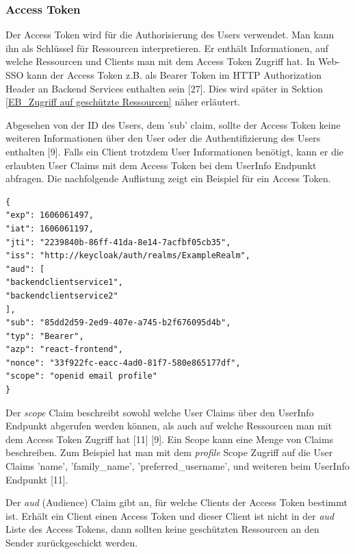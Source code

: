 \subsubsection{Access Token} \label{EB_AccessToken}

Der Access Token wird für die Authorisierung des Users verwendet. Man kann ihn als Schlüssel für Ressourcen interpretieren. Er enthält Informationen, auf welche Ressourcen und Clients man mit dem Access Token Zugriff hat. In Web-SSO kann der Access Token z.B. als Bearer Token im HTTP Authorization Header an Backend Services enthalten sein [27]. Dies wird später in Sektion \ref{EB_Zugriff auf geschützte Ressourcen} näher erläutert.

Abgesehen von der ID des Users, dem 'sub' claim, sollte der Access Token keine weiteren Informationen über den User oder die Authentifizierung des Users enthalten [9]. Falls ein Client trotzdem User Informationen benötigt, kann er die erlaubten User Claims mit dem Access Token bei dem UserInfo Endpunkt abfragen. Die nachfolgende Auflistung zeigt ein Beispiel für ein Access Token.

\begin{lstlisting}[caption=Beispiel Access Token, captionpos=b]
{
"exp": 1606061497,
"iat": 1606061197,
"jti": "2239840b-86ff-41da-8e14-7acfbf05cb35",
"iss": "http://keycloak/auth/realms/ExampleRealm",
"aud": [
"backendclientservice1",
"backendclientservice2"
],
"sub": "85dd2d59-2ed9-407e-a745-b2f676095d4b",
"typ": "Bearer",
"azp": "react-frontend",
"nonce": "33f922fc-eacc-4ad0-81f7-580e865177df",
"scope": "openid email profile"
}
\end{lstlisting}

Der \emph{scope} Claim beschreibt sowohl welche User Claims über den UserInfo Endpunkt abgerufen werden können, als auch auf welche Ressourcen man mit dem Access Token Zugriff hat [11] [9]. Ein Scope kann eine Menge von Claims beschreiben. Zum Beispiel hat man mit dem \emph{profile} Scope Zugriff auf die User Claims 'name', 'family\_name', 'preferred\_username', und weiteren beim UserInfo Endpunkt [11]. 

Der \emph{aud} (Audience) Claim gibt an, für welche Clients der Access Token bestimmt ist. Erhält ein Client einen Access Token und dieser Client ist nicht in der \emph{aud} Liste des Access Tokens, dann sollten keine geschützten Ressourcen an den Sender zurückgeschickt werden.



